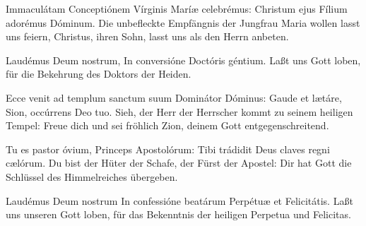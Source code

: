 \documentclass[fontsize=9pt,paper=A6,twoside,BCOR=1mm,DIV=22,headinclude]{scrarticle}
\begin{document}
\pagebreak
{}

\begin{paracol}{2}\pcb
	Immaculátam Conceptiónem Vírginis Maríæ celebrémus: \red{*} Christum ejus Fílium adorémus Dóminum.
	\switchcolumn
	Die unbefleckte Empfängnis der Jungfrau Maria wollen lasst uns feiern, \red{*} Christus, ihren Sohn, lasst uns als den Herrn anbeten.
\end{paracol}

\begin{paracol}{2}\pcb
	Laudémus Deum nostrum, \red{*} In conversióne Doctóris géntium.
	\switchcolumn 
	Laßt uns Gott loben, \red{*} für die Bekehrung des Doktors der Heiden.
\end{paracol}

\begin{paracol}{2}\pcb
	Ecce venit ad templum sanctum suum Dominátor Dóminus: \red{*} Gaude et lætáre, Sion, occúrrens Deo tuo.
	\switchcolumn
	Sieh, der Herr der Herrscher kommt zu seinem heiligen Tempel: \red{*} Freue dich und sei fröhlich Zion, deinem Gott entgegenschreitend.
\end{paracol}


\vspace{-.3em}


\vspace{.3em}

\begin{paracol}{2}\pcb
	Tu es pastor óvium, Princeps Apostolórum: \red{*} Tibi trádidit Deus claves regni cælórum.
	\switchcolumn 
	Du bist der Hüter der Schafe, der Fürst der Apostel: \red{*} Dir hat Gott die Schlüssel des Himmelreiches übergeben.
\end{paracol}

\begin{paracol}{2}\pcb
	Laudémus Deum nostrum \red{*} In confessióne beatárum Perpétuæ et Felicitátis.
	\switchcolumn 
	Laßt uns unseren Gott loben, \red{*} für das Bekenntnis der heiligen Perpetua und Felicitas.
\end{paracol}
\end{document}
